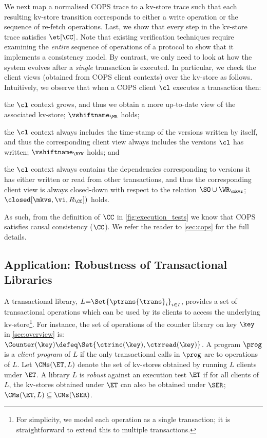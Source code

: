 We next map a normalised COPS trace to a kv-store trace such that each resulting 
kv-store transition corresponds 
to either a write operation or the sequence of re-fetch operations. 
Last, we show that every step in the kv-store trace satisfies \( \et[\CC] \).
Note that existing verification techniques \cite{framework-concur,seebelieve} require examining 
the \emph{entire} sequence of operations of a protocol to show that it implements a consistency model.
By contrast, we only need to look at how the system evolves after a \emph{single} transaction is executed.
In particular, we check the client views (obtained from COPS client contexts) over the kv-store as follows.
Intuitively, we observe that when a COPS client $\cl$ executes a transaction then:
\begin{enumerate*} 
\item the $\cl$ context grows, and thus we obtain a more up-to-date view of the associated kv-store; \ie $\vshiftname_{\MR}$ holds;
\item the $\cl$ context always includes the time-stamp of the versions written by itself, and thus the 
corresponding client view always includes the versions $\cl$ has written; \ie $\vshiftname_{\RYW}$ holds; and
\item the $\cl$ context always contains the dependencies corresponding to versions it has 
either written or read from other transactions, and thus the corresponding client view is always closed-down 
with respect to the relation $\SO \cup \WR_{\mkvs}$; \ie $\closed[\mkvs, \vi, R_{\CC}])$ holds.
\end{enumerate*}
As such, from the definition of $\CC$ in \cref{fig:execution_tests} we know that COPS satisfies causal consistency ($\CC$).
We refer the reader to \cref{sec:cops} for the full details.

\subsection{Application: Robustness of Transactional Libraries}
\label{sec:robustness}
A transactional library, $L {=} \Set{\ptrans{\trans}_{i}}_{i \in I}$,
provides a set of transactional operations which can be used by its clients to access the underlying
kv-store\footnote{For simplicity, we model each operation as a single transaction; it is straightforward to extend this to multiple transactions.}. 
For instance, the set of operations of the counter library on key $\key$ in \cref{sec:overview} is: $\Counter(\key) \defeq \Set{\ctrinc(\key), \ctrread(\key)}$.
A program $\prog$ is a \emph{client program} of $L$ if the only transactional calls in $\prog$ are to operations of $L$.  
Let $\CMs(\ET, L)$ denote the set of kv-stores obtained by running $L$ clients under $\ET$.
A library $L$ is \emph{robust} against an execution test
$\ET$ if for all clients of $L$, the kv-stores obtained under $\ET$ can also be obtained under $\SER$; 
\ie $\CMs(\ET, L) \subseteq \CMs(\SER)$.

